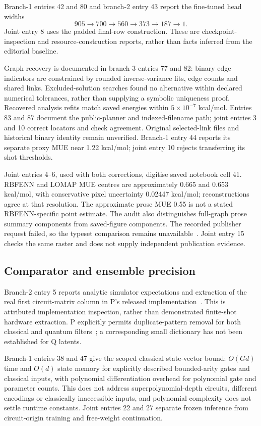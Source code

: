 \documentclass{article}
\begin{document}
Branch-1 entries 42 and 80 and branch-2 entry 43 report the fine-tuned head widths
\[
905\longrightarrow700\longrightarrow560\longrightarrow373
\longrightarrow187\longrightarrow1.
\]
Joint entry 8 uses the padded final-row construction. These are checkpoint-inspection and resource-construction reports, rather than facts inferred from the editorial baseline.

Graph recovery is documented in branch-3 entries 77 and 82: binary edge indicators are constrained by rounded inverse-variance fits, edge counts and shared links. Excluded-solution searches found no alternative within declared numerical tolerances, rather than supplying a symbolic uniqueness proof. Recovered analysis refits match saved energies within \(5\times10^{-7}\) kcal/mol. Entries 83 and 87 document the public-planner and indexed-filename path; joint entries 3 and 10 correct locators and check agreement. Original selected-link files and historical binary identity remain unverified. Branch-1 entry 44 reports its separate proxy MUE near 1.22 kcal/mol; joint entry 10 rejects transferring its shot thresholds.

Joint entries 4--6, used with both corrections, digitise saved notebook cell 41. RBFENN and LOMAP MUE centres are approximately 0.665 and 0.653 kcal/mol, with conservative pixel uncertainty 0.02447 kcal/mol; reconstructions agree at that resolution. The approximate prose MUE 0.55 is not a stated RBFENN-specific point estimate. The audit also distinguishes full-graph prose summary components from saved-figure components. The recorded publisher request failed, so the typeset comparison remains unavailable~\cite{Q,Qnotebook,publisher}. Joint entry 15 checks the same raster and does not supply independent publication evidence.

\subsection{Comparator and ensemble precision}

Branch-2 entry 5 reports analytic simulator expectations and extraction of the real first circuit-matrix column in P's released implementation~\cite{Player,Pextract}. This is attributed implementation inspection, rather than demonstrated finite-shot hardware extraction. P explicitly permits duplicate-pattern removal for both classical and quantum filters~\cite{P}; a corresponding small dictionary has not been established for Q latents.

Branch-1 entries 38 and 47 give the scoped classical state-vector bound: \(O(Gd)\) time and \(O(d)\) state memory for explicitly described bounded-arity gates and classical inputs, with polynomial differentiation overhead for polynomial gate and parameter counts. This does not address superpolynomial-depth circuits, different encodings or classically inaccessible inputs, and polynomial complexity does not settle runtime constants. Joint entries 22 and 27 separate frozen inference from circuit-origin training and free-weight continuation.
\end{document}
